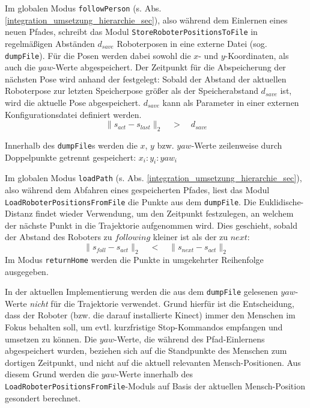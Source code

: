 Im globalen Modus \lstinline{followPerson} (s. Abs. \ref{integration_umsetzung_hierarchie_sec}), also während dem Einlernen eines neuen Pfades,
 schreibt das Modul \lstinline{StoreRoboterPositionsToFile} in regelmäßigen Abständen $d_{save}$ Roboterposen in eine externe Datei (sog. \lstinline{dumpFile}).
Für die Posen werden dabei sowohl die $x$- und $y$-Koordinaten, als auch die $yaw$-Werte abgespeichert.
Der Zeitpunkt für die Abspeicherung der nächsten Pose wird anhand der  festgelegt:
Sobald der Abstand der aktuellen Roboterpose zur letzten Speicherpose größer als der Speicherabstand $d_{save}$ ist, wird die aktuelle Pose abgespeichert.
$d_{save}$ kann als Parameter in einer externen Konfigurationsdatei definiert werden.
\begin{equation}
	\| s_{act} - s_{last}\|_2 \quad > \quad d_{save}
\end{equation}

Innerhalb des \lstinline{dumpFile}s werden die $x$, $y$ bzw. $yaw$-Werte zeilenweise durch Doppelpunkte getrennt gespeichert:
$x_i:y_i:yaw_i$

Im globalen Modus \lstinline{loadPath} (s. Abs. \ref{integration_umsetzung_hierarchie_sec}), also während dem Abfahren eines gespeicherten Pfades, liest das Modul \lstinline{LoadRoboterPositionsFromFile} die Punkte aus dem \lstinline{dumpFile}.
Die \gls{Euklidische-Distanz} findet wieder Verwendung, um den Zeitpunkt festzulegen, an welchem der nächste Punkt in die Trajektorie aufgenommen wird.
Dies geschieht, sobald der Abstand des Roboters zu $following$ kleiner ist als der zu $next$:
\begin{equation}
	\| s_{foll} - s_{act} \|_2 \quad < \quad \| s_{next} - s_{act} \|_2
\end{equation}
Im Modus \lstinline{returnHome} werden die Punkte in umgekehrter Reihenfolge ausgegeben.

In der aktuellen Implementierung werden die aus dem \lstinline{dumpFile} gelesenen $yaw$-Werte \emph{nicht} für die Trajektorie verwendet.
Grund hierfür ist die Entscheidung, dass der Roboter (bzw. die darauf installierte Kinect) immer den Menschen im Fokus behalten soll, um evtl. kurzfristige Stop-Kommandos empfangen und umsetzen zu können.
Die $yaw$-Werte, die während des Pfad-Einlernens abgespeichert wurden, beziehen sich auf die Standpunkte des Menschen zum dortigen Zeitpunkt, und nicht auf die aktuell relevanten Mensch-Positionen. 
Aus diesem Grund werden die $yaw$-Werte innerhalb des \lstinline{LoadRoboterPositionsFromFile}-Moduls auf Basis der aktuellen Mensch-Position gesondert berechnet.

